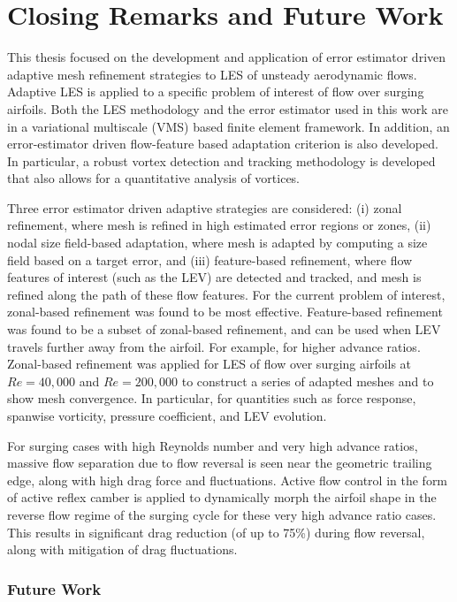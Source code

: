 \chapter{Closing Remarks and Future Work}

This thesis focused on the development and application of error estimator driven adaptive mesh refinement strategies to LES of unsteady aerodynamic flows.
Adaptive LES is applied to a specific problem of interest of flow over surging airfoils.
Both the LES methodology and the error estimator used in this work are in a variational multiscale (VMS) based finite element framework.
In addition, an error-estimator driven flow-feature based adaptation criterion is also developed. In particular, a robust vortex detection and tracking methodology is developed that also allows for a quantitative analysis of vortices.

Three error estimator driven adaptive strategies are considered: (i) zonal refinement, where mesh is refined in high estimated error regions or zones, (ii) nodal size field-based adaptation, where mesh is adapted by computing a size field based on a target error, and (iii) feature-based refinement, where flow features of interest (such as the LEV) are detected and tracked, and mesh is refined along the path of these flow features.
For the current problem of interest, zonal-based refinement was found to be most effective.
Feature-based refinement was found to be a subset of zonal-based refinement, and can be used when LEV travels further away from the airfoil. 
For example, for higher advance ratios.
Zonal-based refinement was applied for LES of flow over surging airfoils at $Re=40,000$ and $Re=200,000$ to construct a series of adapted meshes and to show mesh convergence. In particular, for quantities such as force response, spanwise vorticity, pressure coefficient, and LEV evolution.

For surging cases with high Reynolds number and very high advance ratios, massive flow separation due to flow reversal is seen near the geometric trailing edge, along with high drag force and fluctuations. 
Active flow control in the form of active reflex camber is applied to dynamically morph the airfoil shape in the reverse flow regime of the surging cycle for these very high advance ratio cases.
This results in significant drag reduction (of up to 75\%) during flow reversal, along with mitigation of drag fluctuations.

\subsection{Future Work}

